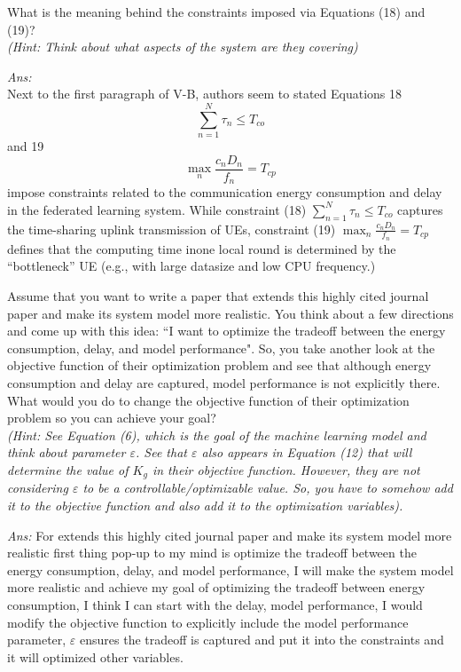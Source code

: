 \documentclass{article} %
\begin{document}
\begin{question}
What is the meaning behind the constraints imposed via Equations (18) and (19)?
\\ \textit{(Hint: Think about what aspects of the system are they covering)}
\end{question}
\textit{Ans:}
\\ Next to the first paragraph of V-B, authors seem to stated Equations 18 $$\sum_{n=1}^N\tau_n\leq T_{co}$$ and 19 $$\max_{n}\frac{c_{n}D_{n}}{f_{n}}=T_{cp}$$ impose constraints related to the communication energy consumption and delay in the federated learning system. 
While constraint (18) $\sum_{n=1}^N\tau_n\leq T_{co}$ captures the time-sharing uplink transmission of UEs, constraint (19) $\max_{n}\frac{c_{n}D_{n}}{f_{n}}=T_{cp}$ defines that the computing time inone local round is determined by  the “bottleneck” UE (e.g., with large datasize and low CPU frequency.)


\begin{question}
Assume that you want to write a paper that extends this highly cited journal paper and make its system model more realistic. You think about a few directions and come up with this idea: “I want to optimize the tradeoff between the energy consumption, delay, and model performance". So, you take another look at the objective function of their optimization problem and see that although energy consumption and delay are captured, model performance is not explicitly there. What would you do to change the objective function of their optimization problem so you can achieve your goal?\\ \textit{(Hint: See Equation (6), which is the goal of the machine learning model and think about parameter $\varepsilon$. See that $\varepsilon$ also appears in Equation (12) that will determine the value of $K_g$ in their objective function. However, they are not considering $\varepsilon$ to be a controllable/optimizable value. So, you have to somehow add it to the objective function and also add it to the optimization variables).}
\end{question}
\textit{Ans: }For extends this highly cited journal paper and make its system model more realistic first thing pop-up to my mind is optimize the tradeoff between the energy consumption, delay, and model performance, I will make the system model more realistic and achieve my goal of optimizing the tradeoff between energy consumption, I think I can start with the delay, model performance, I would modify the objective function to explicitly include the model performance parameter, 
$\varepsilon$ ensures the tradeoff is captured and put it into the constraints and it will optimized other variables. 
\end{document}
